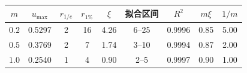 \begin{tabular}{ccccccccc}
\toprule
$m$ & $u_{\max}$ & $r_{1/e}$ & $r_{1\%}$ & $\xi$ & 拟合区间 & $R^2$ & $m\xi$ & $1/m$ \\
\midrule
$0.2$ & 0.5297 & 2 & 16 & 4.26 & 6--25 & 0.9996 & 0.85 & 5.00 \\
$0.5$ & 0.3769 & 2 & 7 & 1.74 & 3--10 & 0.9994 & 0.87 & 2.00 \\
$1.0$ & 0.2540 & 1 & 4 & 0.90 & 2--5 & 0.9997 & 0.90 & 1.00 \\
\bottomrule
\end{tabular}
